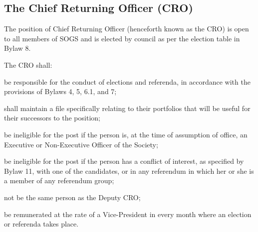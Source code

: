 \subsection {The Chief Returning Officer (CRO)}
\begin{longenum}[ label*=\thesubsection.\arabic*., align=left]
	\item The position of Chief Returning Officer (henceforth known as the CRO) is open to all members of SOGS and is elected by council as per the election table in Bylaw 8.
    \item The CRO shall: 
    \begin{longenum}[ label*=\arabic*., align=left]
		\item  be responsible for the conduct of elections and referenda, in accordance with the provisions of Bylaws 4, 5, 6.1, and 7; 
		\item shall maintain a file specifically relating to their portfolios that will be useful for their successors to the position; 
        \item be ineligible for the post if the person is, at the time of assumption of office, an Executive or Non-Executive Officer of the Society; 
        \item be ineligible for the post if the person has a conflict of interest, as specified by Bylaw 11, with one of the candidates, or in any referendum in which her or she is a member of any referendum group;
        \item not be the same person as the Deputy CRO;
        \item be remunerated at the rate of a Vice-President in every month where an election or referenda takes place. 
        \end{longenum}
\end{longenum}
